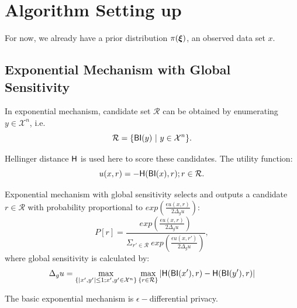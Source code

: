 \section{Algorithm Setting up}
\label{sec_setup}
For now, we already have a prior distribution $\pi(\boldsymbol{\xi})$, an observed data set $x$.

\subsection{Exponential Mechanism with Global Sensitivity}
\label{subsec_emgs}


In exponential mechanism, candidate set $\mathcal{R}$ can be obtained by enumerating $y \in \mathcal{X}^n$, i.e.
\begin{equation*}
\mathcal{R} = \{\mathsf{BI}(y)\ |\ y \in \mathcal{X}^n\}.
\end{equation*}

Hellinger distance $\mathsf{H}$ is used here to score these candidates. The utility function:
\begin{equation}
\label{equ_utility}
u(x,r) = -\mathsf{H}(\mathsf{BI}(x), r); r \in \mathcal{R}.
\end{equation}

Exponential mechanism with global sensitivity selects and outputs a candidate $r \in \mathcal{R}$ with probability proportional to $exp(\frac{\epsilon u(x,r)}{2 \Delta_{g}u})$:
\begin{equation*}
P[r] = \frac
{exp(\frac{\epsilon u(x,r)}{2 \Delta_{g}u})}
{\Sigma_{r' \in \mathcal{R}}\ exp(\frac{\epsilon u(x,r')}{2 \Delta_{g}u})},
\end{equation*}
where global sensitivity is calculated by:
\begin{equation*}
\Delta_{g}u = 
\max_{\{|x',y'| \leq 1;x',y'\in \mathcal{X}^n\}}\max_{\{r\in \mathcal{R}\}}
|\mathsf{H}(\mathsf{BI}(x'), r) - \mathsf{H}(\mathsf{BI}(y'), r)|
\end{equation*}

The basic exponential mechanism is $\epsilon -$differential privacy\cite{dwork2014algorithmic}.


